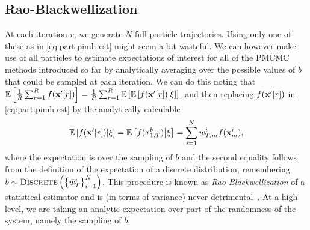 \subsection{Rao-Blackwellization}
\label{sec:part:pmcmc:all}

At each \mcmc iteration $r$, we generate $N$ full particle trajectories. 
Using only one of these as in \eqref{eq:part:pimh-est} might seem a bit wasteful. 
We can however make use of all particles to estimate expectations of interest for all
of the PMCMC methods introduced so far by analytically averaging over the possible
values of $b$ that could be sampled at each iteration. 
We can do this noting that $\mathbb{E}\left[\frac{1}{R} \sum_{r=1}^{R} f(\mathbf{x}'[r]) \right]
= \frac{1}{R} \sum_{r=1}^{R} \mathbb{E}\left[\mathbb{E}\left[ f(\mathbf{x}'[r]) \middle| \mathbf{\xi}\right]\right]$,
and then replacing $f(\mathbf{x}'[r])$ in \eqref{eq:part:pimh-est}  by the analytically calculable
\begin{align}
\label{eq:part:rao-pg}
\mathbb{E}\left[f(\mathbf{x}'[r]) \middle| \mathbf{\xi} \right] = \mathbb{E}\left[f(x_{1:T}^b) \middle| \mathbf{\xi} \right]
= \sum_{i=1}^N \bar w_{T,m}^i f(\mathbf{x}_{m}^i),
\end{align}
where the expectation is over the sampling of $b$ and  the second equality follows 
from the definition of the expectation of a discrete distribution,
remembering $b \sim \operatorname*{\textsc{Discrete}}\left(\left\{\bar w_{T}^i\right\}_{i=1}^N\right)$.
This procedure is known as \emph{Rao-Blackwellization} of a statistical estimator and is (in terms of variance) 
never detrimental~\citep{casella1996rao}.  At a high level, we are taking an analytic expectation over part of
the randomness of the system, namely the sampling of $b$.



